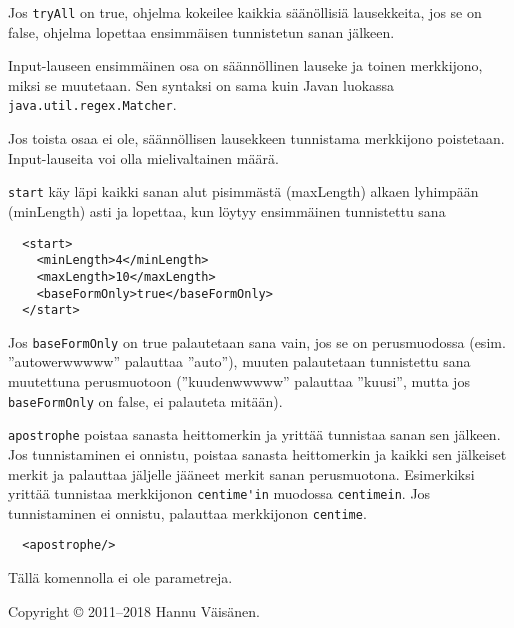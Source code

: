 \documentclass[12pt]{article}
\begin{document}
Jos \verb=tryAll= on true, ohjelma kokeilee kaikkia säänöllisiä
lausekkeita, jos se on false, ohjelma lopettaa ensimmäisen tunnistetun
sanan jälkeen.

Input-lauseen ensimmäinen osa on säännöllinen lauseke ja toinen
merkkijono, miksi se muutetaan. Sen syntaksi on sama kuin Javan
luokassa \verb=java.util.regex.Matcher=.

Jos toista osaa ei ole, säännöllisen lausekkeen tunnistama merkkijono
poistetaan. Input-lauseita voi olla mielivaltainen määrä.




\bigskip
\verb=start= käy läpi kaikki sanan alut pisimmästä (maxLength) alkaen
lyhimpään (minLength) asti ja lopettaa, kun löytyy ensimmäinen
tunnistettu sana

\begin{verbatim}
  <start>
    <minLength>4</minLength>
    <maxLength>10</maxLength>
    <baseFormOnly>true</baseFormOnly>
  </start>
\end{verbatim}

Jos \verb=baseFormOnly= on true palautetaan sana vain, jos se on
perusmuodossa (esim. ''autowerwwwww'' palauttaa ''auto''), muuten
palautetaan tunnistettu sana muutettuna perusmuotoon (''kuudenwwwww''
palauttaa ''kuusi'', mutta jos \verb=baseFormOnly= on false, ei
palauteta mitään).




\bigskip

\verb=apostrophe= poistaa sanasta heittomerkin ja yrittää tunnistaa
sanan sen jälkeen. Jos tunnistaminen ei onnistu, poistaa sanasta
heittomerkin ja kaikki sen jälkeiset merkit ja palauttaa jäljelle
jääneet merkit sanan perusmuotona. Esimerkiksi yrittää tunnistaa
merkkijonon \verb=centime'in= muodossa \verb=centimein=. Jos
tunnistaminen ei onnistu, palauttaa merkkijonon \verb=centime=.


\begin{verbatim}
  <apostrophe/>
\end{verbatim}

Tällä komennolla ei ole parametreja.


\bigskip \noindent \noindent
Copyright © 2011--2018 Hannu Väisänen.
\end{document}
